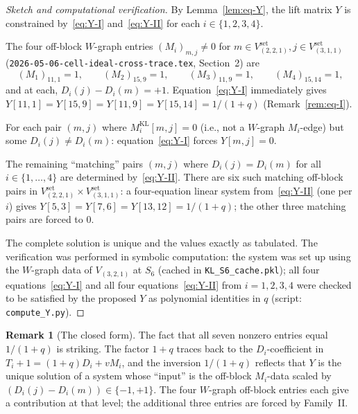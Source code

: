 \documentclass[11pt]{article}
\theoremstyle{definition}
\newtheorem{remark}[theorem]{Remark}
\begin{document}
\begin{proof}[Sketch and computational verification]
By Lemma~\ref{lem:eq-Y}, the lift matrix $Y$ is constrained by~\eqref{eq:Y-I} and~\eqref{eq:Y-II} for each $i \in \{1, 2, 3, 4\}$.

The four off-block $W$-graph entries $(M_i)_{m, j} \neq 0$ for $m \in V_{(2,2,1)}^{\mathrm{set}}, j \in V_{(3,1,1)}^{\mathrm{set}}$ (\texttt{2026-05-06-cell-ideal-cross-trace.tex}, Section~2) are
\[
(M_1)_{11, 1} = 1, \qquad (M_2)_{15, 9} = 1, \qquad (M_3)_{11, 9} = 1, \qquad (M_4)_{15, 14} = 1,
\]
and at each, $D_i(j) - D_i(m) = +1$. Equation~\eqref{eq:Y-I} immediately gives $Y[11,1] = Y[15,9] = Y[11,9] = Y[15,14] = 1/(1+q)$ (Remark~\ref{rem:eq-I}).

For each pair $(m, j)$ where $M_i^{\mathrm{KL}}[m, j] = 0$ (i.e., not a $W$-graph $M_i$-edge) but some $D_i(j) \neq D_i(m)$: equation~\eqref{eq:Y-I} forces $Y[m, j] = 0$.

The remaining ``matching'' pairs $(m, j)$ where $D_i(j) = D_i(m)$ for all $i \in \{1,\ldots,4\}$ are determined by~\eqref{eq:Y-II}. There are six such matching off-block pairs in $V_{(2,2,1)}^{\mathrm{set}} \times V_{(3,1,1)}^{\mathrm{set}}$: a four-equation linear system from~\eqref{eq:Y-II} (one per $i$) gives $Y[5, 3] = Y[7, 6] = Y[13, 12] = 1/(1+q)$; the other three matching pairs are forced to $0$.

The complete solution is unique and the values exactly as tabulated. The verification was performed in symbolic computation: the system was set up using the $W$-graph data of $V_{(3,2,1)}$ at $S_6$ (cached in \texttt{KL\_S6\_cache.pkl}); all four equations~\eqref{eq:Y-I} and all four equations~\eqref{eq:Y-II} from $i = 1, 2, 3, 4$ were checked to be satisfied by the proposed $Y$ as polynomial identities in $q$ (script: \texttt{compute\_Y.py}). \qedhere
\end{proof}

\begin{remark}[The closed form]\label{rem:closed-form}
The fact that all seven nonzero entries equal $1/(1+q)$ is striking. The factor $1+q$ traces back to the $D_i$-coefficient in $T_i + 1 = (1+q)D_i + vM_i$, and the inversion $1/(1+q)$ reflects that $Y$ is the unique solution of a system whose ``input'' is the off-block $M_i$-data scaled by $(D_i(j) - D_i(m)) \in \{-1, +1\}$. The four $W$-graph off-block entries each give a contribution at that level; the additional three entries are forced by Family~II.
\end{remark}
\end{document}
